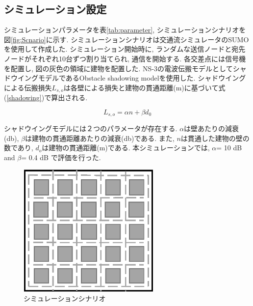\documentclass[10pt]{jreport}
\begin{document}
\subsection{シミュレーション設定}
シミュレーションパラメータを表\ref{tab:parameter}, シミュレーションシナリオを図\ref{fig:Scnario}に示す. シミュレーションシナリオは交通流シミュレータのSUMO\cite{27}を使用して作成した. シミュレーション開始時に, ランダムな送信ノードと宛先ノードがそれぞれ10台ずつ割り当てられ, 通信を開始する. 各交差点には信号機を配置し, 図の灰色の領域に建物を配置した. 
NS-3の電波伝搬モデルとしてシャドウイングモデルであるObstacle shadowing model\cite{20}を使用した. シャドウイングによる伝搬損失$L_{s,o}$は各壁による損失と建物の貫通距離(m)に基づいて式(\ref{shadowing})で算出される.

\begin{equation}
	\label{shadowing}
	L_{s,o} = \alpha n  + \beta d_0
\end{equation}

シャドウイングモデルには２つのパラメータが存在する. $\alpha$は壁あたりの減衰(db), $\beta$は建物の貫通距離あたりの減衰(db)である. また, $n$は貫通した建物の壁の数であり, $d_{o}$は建物の貫通距離(m)である.
本シミュレーションでは, $\alpha$= 10 dB and $\beta$= 0.4 dB で評価を行った. 

\begin{figure}[!ht]
	\centering
	\includegraphics[width=70mm]{figures/Scenario.eps}
	\caption{シミュレーションシナリオ}
	\label{fig:Scenario}
\end{figure}
\end{document}
